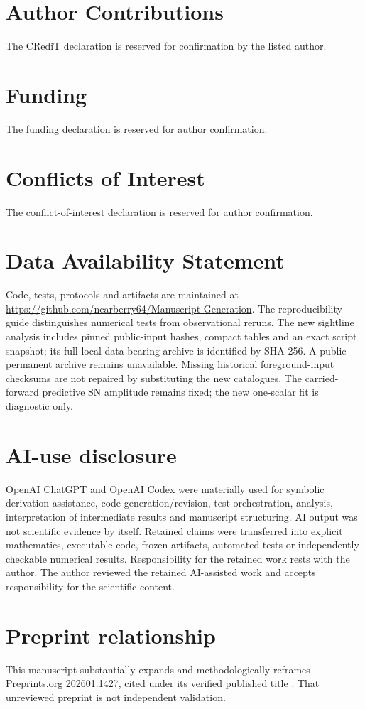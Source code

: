 \section*{Author Contributions}
The CRediT declaration is reserved for confirmation by the listed author.
\section*{Funding}
The funding declaration is reserved for author confirmation.
\section*{Conflicts of Interest}
The conflict-of-interest declaration is reserved for author confirmation.
\section*{Data Availability Statement}
Code, tests, protocols and artifacts are maintained at
\url{https://github.com/ncarberry64/Manuscript-Generation}.
The reproducibility guide distinguishes numerical tests from observational
reruns. The new sightline analysis includes pinned public-input hashes,
compact tables and an exact script snapshot; its full local data-bearing
archive is identified by SHA-256. A public permanent archive remains unavailable. Missing historical foreground-input checksums are not
repaired by substituting the new catalogues. The carried-forward predictive
SN amplitude remains fixed; the new one-scalar fit is diagnostic only.
\section*{AI-use disclosure}
OpenAI ChatGPT and OpenAI Codex were materially used for symbolic derivation
assistance, code generation/revision, test orchestration, analysis,
interpretation of intermediate results and manuscript structuring.
AI output was not scientific evidence by itself. Retained claims were
transferred into explicit mathematics, executable code, frozen artifacts,
automated tests or independently checkable numerical results.
Responsibility for the retained work rests with the author.
The author reviewed the retained AI-assisted work and accepts responsibility for the scientific content.
\section*{Preprint relationship}
This manuscript substantially expands and methodologically reframes
Preprints.org 202601.1427, cited under its verified published
title \citep{Carberry2026Topographic}. That unreviewed preprint is not
independent validation.

